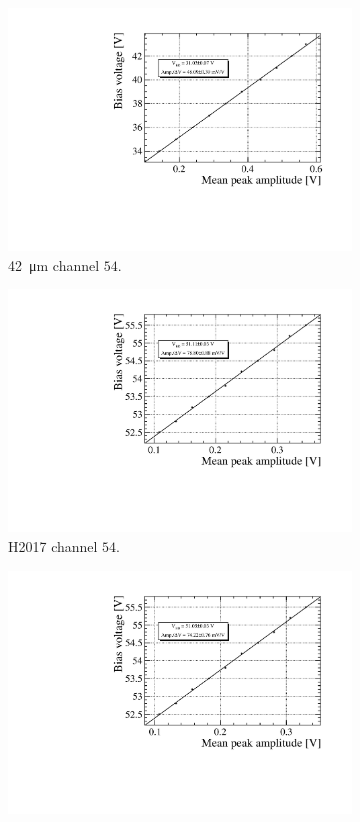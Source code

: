 \begin{figure}
  \begin{subfigure}{0.48\textwidth}
    \includegraphics[width=1\linewidth]{gfx/plots/WA/42/Breakdown_voltage54.pdf}
    \caption{\SI{42}{\micro m} channel $54$.}
  \end{subfigure}
  \hfill
  \begin{subfigure}{0.48\textwidth}
    \includegraphics[width=1\linewidth]{gfx/plots/WA/H2017/Breakdown_voltage54.pdf}
    \caption{H2017 channel $54$.}
  \end{subfigure}
  \hfill
  \begin{subfigure}{0.48\textwidth}
    \includegraphics[width=1\linewidth]{gfx/plots/WA/H2017/Breakdown_voltage86.pdf}

\end{subfigure}
\end{figure}
